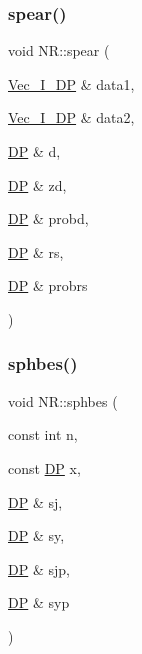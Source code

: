 \mbox{\label{namespaceNR_a6bc9d94a243840f52c5520b6e963b9c1}} 
\subsubsection{\texorpdfstring{spear()}{spear()}}
{\footnotesize\ttfamily void N\+R\+::spear (\begin{DoxyParamCaption}\item[{\mbox{\hyperlink{namespaceNR_a9f943da53862537c552e2a770cb170ae}{Vec\+\_\+\+I\+\_\+\+DP}} \&}]{data1,  }\item[{\mbox{\hyperlink{namespaceNR_a9f943da53862537c552e2a770cb170ae}{Vec\+\_\+\+I\+\_\+\+DP}} \&}]{data2,  }\item[{\mbox{\hyperlink{namespaceNR_af6ff762dd605ff477b8e52387253a02a}{DP}} \&}]{d,  }\item[{\mbox{\hyperlink{namespaceNR_af6ff762dd605ff477b8e52387253a02a}{DP}} \&}]{zd,  }\item[{\mbox{\hyperlink{namespaceNR_af6ff762dd605ff477b8e52387253a02a}{DP}} \&}]{probd,  }\item[{\mbox{\hyperlink{namespaceNR_af6ff762dd605ff477b8e52387253a02a}{DP}} \&}]{rs,  }\item[{\mbox{\hyperlink{namespaceNR_af6ff762dd605ff477b8e52387253a02a}{DP}} \&}]{probrs }\end{DoxyParamCaption})}

\mbox{\label{namespaceNR_ab729e0038cdadb95f6f51d2a3d2844a2}} 
\subsubsection{\texorpdfstring{sphbes()}{sphbes()}}
{\footnotesize\ttfamily void N\+R\+::sphbes (\begin{DoxyParamCaption}\item[{const int}]{n,  }\item[{const \mbox{\hyperlink{namespaceNR_af6ff762dd605ff477b8e52387253a02a}{DP}}}]{x,  }\item[{\mbox{\hyperlink{namespaceNR_af6ff762dd605ff477b8e52387253a02a}{DP}} \&}]{sj,  }\item[{\mbox{\hyperlink{namespaceNR_af6ff762dd605ff477b8e52387253a02a}{DP}} \&}]{sy,  }\item[{\mbox{\hyperlink{namespaceNR_af6ff762dd605ff477b8e52387253a02a}{DP}} \&}]{sjp,  }\item[{\mbox{\hyperlink{namespaceNR_af6ff762dd605ff477b8e52387253a02a}{DP}} \&}]{syp }\end{DoxyParamCaption})}

